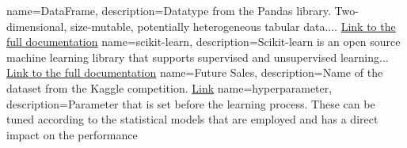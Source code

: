 
{
    name=DataFrame,
    description={Datatype from the Pandas library. Two-dimensional, size-mutable, potentially heterogeneous tabular data.... \href{https://pandas.pydata.org/pandas-docs/stable/reference/api/pandas.DataFrame.html}{Link to the full documentation}}
}
{
    name=scikit-learn,
    description={Scikit-learn is an open source machine learning library that supports supervised and unsupervised learning... \href{https://scikit-learn.org/stable/getting_started.html}{Link to the full documentation}}
}
{
    name=Future Sales,
    description={Name of the dataset from the Kaggle competition. \href{https://www.kaggle.com/c/competitive-data-science-predict-future-sales/}{Link}}
}
{
    name=hyperparameter,
    description={Parameter that is set before the learning process. These can be tuned according to the statistical models that are employed and has a direct impact on the performance}
}

